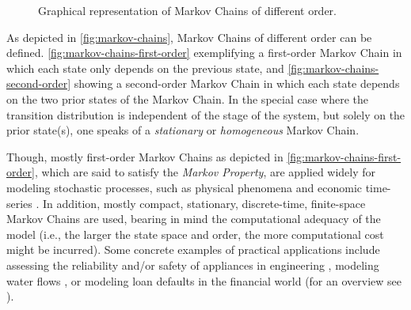 \begin{figure}[t!]
	\captionsetup[subfigure]{justification=centering}
	\centering
	 \quad
	\caption{Graphical representation of Markov Chains of different order.}
	\label{fig:markov-chains}
\end{figure}

As depicted in \autoref{fig:markov-chains}, Markov Chains of different order can be defined. \autoref{fig:markov-chains-first-order} exemplifying a first-order Markov Chain in which each state only depends on the previous state, and \autoref{fig:markov-chains-second-order} showing a second-order Markov Chain in which each state depends on the two prior states of the Markov Chain.
In the special case where the transition distribution is independent of the stage of the system, but solely on the prior state(s), one speaks of a \textit{stationary} or \textit{homogeneous} Markov Chain.

Though, mostly first-order Markov Chains as depicted in \autoref{fig:markov-chains-first-order}, which are said to satisfy the \textit{Markov Property}, are applied widely for modeling stochastic processes, such as physical phenomena and economic time-series \cite{bacciu2015probabilistic}.
In addition, mostly compact, stationary, discrete-time, finite-space Markov Chains are used, bearing in mind the computational adequacy of the model (i.e., the larger the state space and order, the more computational cost might be incurred).
Some concrete examples of practical applications include assessing the reliability and/or safety of appliances in engineering \cite{cochran2001generic, cronvall2009combining,el2008optimal}, modeling water flows \cite{parent1991stochastic}, or modeling loan defaults \cite{grimshaw2011markov} in the financial world (for an overview see \cite{pasanisi2012estimating}).

